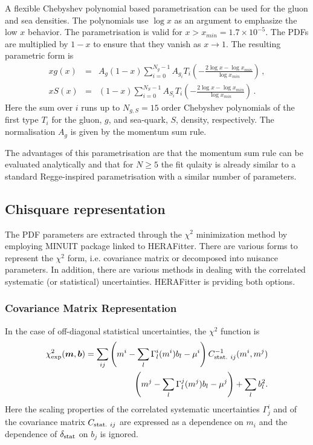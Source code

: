 \begin{description}
A flexible Chebyshev polynomial based parametrisation can be used for the gluon and sea densities. The polynomials
use $\log x$ as an argument to emphasize the low $x$ behavior. 
The parametrisation is valid for $x>x_{min} = 1.7\times 10^{-5}$. The PDFs are multiplied
by $1-x$ to ensure that they vanish as $x\to 1$. The resulting parametric form is 
\begin{eqnarray}
x g(x) &=& A_g \left(1-x\right) \sum_{i=0}^{N_g-1} A_{g_i} T_i \left(-\frac{\textstyle 2\log x - \log x_{min} } {\textstyle \log x_{min} } \right)\,, \label{eq:glu} \\
x S(x) &=& \left(1-x\right) \sum_{i=0}^{N_S-1} A_{S_i} T_i \left(-\frac{\textstyle 2\log x - \log x_{min} } {\textstyle \log x_{min} } \right)\,. \label{eq:sea} 
\end{eqnarray}
Here the sum over $i$ runs up to $N_{g,S}=15$ order Chebyshev polynomials of the first type $T_i$ for
the gluon, $g$, and sea-quark, $S$, density, respectively. 
The normalisation $A_g$ is given by the momentum sum rule.

The advantages of this parametrisation are that the momentum sum rule can be evaluated analytically 
and that for $N \ge 5$ the fit qulaity is already similar
to a standard Regge-inspired parametrisation with a similar number of parameters.



\end{description}

\subsection{Chisquare representation}

The PDF parameters are extracted through the $\chi^2$ minimization method by 
employing MINUIT package linked to HERAFitter. There are various forms to represent the $\chi^2$ form, i.e. covariance matrix or decomposed into nuisance parameters. In addition, there are various methods in dealing with the correlated systematic (or statistical) uncertainties.
HERAFitter is prviding both options.

\subsubsection{Covariance Matrix Representation}

In the case of off-diagonal statistical uncertainties, the $\chi^2$ function
is
\begin{align} 
 \label{eq:chi2gen}
    \chi^2_{\rm exp} (\boldsymbol{m},\boldsymbol{b}) = \sum_{ij} 
         \left ( m^i - \sum_l \Gamma^i_l(m^i)b_l - \mu^i \right) C^{-1}_{{\rm stat.}~ij}(m^i,m^j) \nonumber \\
     \left(  m^j - \sum_l \Gamma^j_l(m^j)b_l - \mu^j \right) +  \sum_l b^2_l.
\end{align}
Here the scaling properties of the correlated systematic uncertainties 
$\Gamma^i_j$ and
of the covariance matrix $C_{{\rm stat.}~ij}$ are expressed as a dependence
on $m_i$ and the dependence of $\delta_{\rm stat}$ on $b_j$ is ignored.


